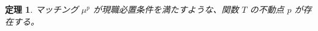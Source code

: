\documentclass[12pt, a4paper]{article}
\theoremstyle{definition}
\theoremstyle{remark}
\theoremstyle{plain}
\newtheorem{theorem}{定理}
\begin{document}









\begin{theorem}
マッチング \( \mu^p \) が現職必置条件を満たすような、関数 \( T \) の不動点 \( p \) が存在する。
\end{theorem}
\end{document}

